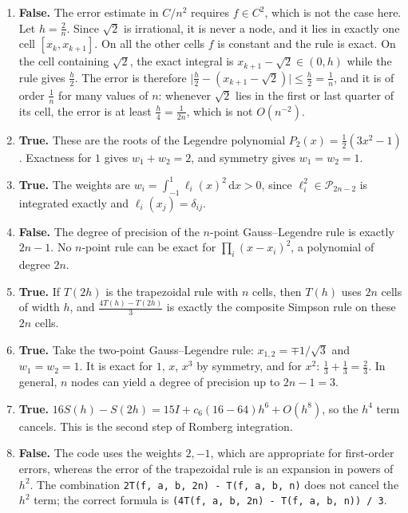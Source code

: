 \documentclass[a4paper]{article}
\renewcommand{\d}{\mathrm d}
\begin{document}
\begin{enumerate}[itemsep=8pt]
    \item \textbf{False.}
        The error estimate in $C/n^2$ requires $f \in C^2$, which is not the case here.
        Let $h = \frac{2}{n}$. Since $\sqrt{2}$ is irrational, it is never a node, and it lies in exactly one cell $[x_k, x_{k+1}]$.
        On all the other cells $f$ is constant and the rule is exact.
        On the cell containing $\sqrt{2}$, the exact integral is $x_{k+1} - \sqrt{2} \in (0, h)$ while the rule gives $\frac{h}{2}$.
        The error is therefore $\bigl\lvert \frac{h}{2} - (x_{k+1} - \sqrt{2}) \bigr\rvert \leq \frac{h}{2} = \frac{1}{n}$,
        and it is of order $\frac{1}{n}$ for many values of $n$:
        whenever $\sqrt{2}$ lies in the first or last quarter of its cell, the error is at least $\frac{h}{4} = \frac{1}{2n}$, which is not $O(n^{-2})$.

    \item \textbf{True.}
        These are the roots of the Legendre polynomial $P_2(x) = \frac{1}{2}(3x^2 - 1)$.
        Exactness for $1$ gives $w_1 + w_2 = 2$, and symmetry gives $w_1 = w_2 = 1$.

    \item \textbf{True.}
        The weights are $w_i = \int_{-1}^1 \ell_i(x)^2 \, \d x > 0$, since $\ell_i^2 \in \mathcal P_{2n-2}$ is integrated exactly and $\ell_i(x_j) = \delta_{ij}$.

    \item \textbf{False.}
        The degree of precision of the $n$-point Gauss--Legendre rule is exactly $2n - 1$.
        No $n$-point rule can be exact for $\prod_{i}(x - x_i)^2$, a polynomial of degree $2n$.

    \item \textbf{True.}
        If $T(2h)$ is the trapezoidal rule with $n$ cells, then $T(h)$ uses $2n$ cells of width $h$, and $\frac{4 T(h) - T(2h)}{3}$ is exactly the composite Simpson rule on these $2n$ cells.

    \item \textbf{True.}
        Take the two-point Gauss--Legendre rule: $x_{1,2} = \mp 1/\sqrt{3}$ and $w_1 = w_2 = 1$.
        It is exact for $1$, $x$, $x^3$ by symmetry, and for $x^2$: $\frac13 + \frac13 = \frac23$.
        In general, $n$ nodes can yield a degree of precision up to $2n - 1 = 3$.

    \item \textbf{True.}
        $16 S(h) - S(2h) = 15 I + c_6 (16 - 64) h^6 + O(h^8)$, so the $h^4$ term cancels.
        This is the second step of Romberg integration.

    \item \textbf{False.}
        The code uses the weights $2, -1$, which are appropriate for first-order errors,
        whereas the error of the trapezoidal rule is an expansion in powers of $h^2$.
        The combination \texttt{2T(f, a, b, 2n) - T(f, a, b, n)} does not cancel the $h^2$ term;
        the correct formula is \texttt{(4T(f, a, b, 2n) - T(f, a, b, n)) / 3}.
\end{enumerate}
\end{document}
